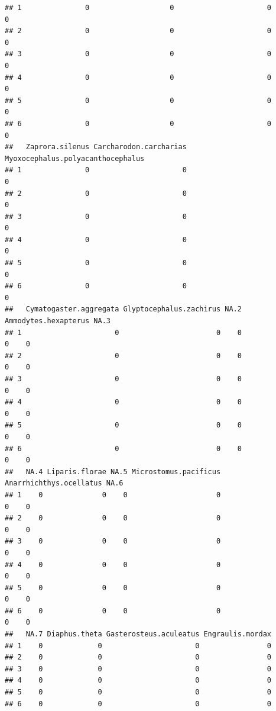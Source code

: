 \documentclass[
]{article}
\begin{document}
\begin{verbatim}
## 1               0                   0                      0                  0
## 2               0                   0                      0                  0
## 3               0                   0                      0                  0
## 4               0                   0                      0                  0
## 5               0                   0                      0                  0
## 6               0                   0                      0                  0
##   Zaprora.silenus Carcharodon.carcharias Myoxocephalus.polyacanthocephalus
## 1               0                      0                                 0
## 2               0                      0                                 0
## 3               0                      0                                 0
## 4               0                      0                                 0
## 5               0                      0                                 0
## 6               0                      0                                 0
##   Cymatogaster.aggregata Glyptocephalus.zachirus NA.2 Ammodytes.hexapterus NA.3
## 1                      0                       0    0                    0    0
## 2                      0                       0    0                    0    0
## 3                      0                       0    0                    0    0
## 4                      0                       0    0                    0    0
## 5                      0                       0    0                    0    0
## 6                      0                       0    0                    0    0
##   NA.4 Liparis.florae NA.5 Microstomus.pacificus Anarrhichthys.ocellatus NA.6
## 1    0              0    0                     0                       0    0
## 2    0              0    0                     0                       0    0
## 3    0              0    0                     0                       0    0
## 4    0              0    0                     0                       0    0
## 5    0              0    0                     0                       0    0
## 6    0              0    0                     0                       0    0
##   NA.7 Diaphus.theta Gasterosteus.aculeatus Engraulis.mordax
## 1    0             0                      0                0
## 2    0             0                      0                0
## 3    0             0                      0                0
## 4    0             0                      0                0
## 5    0             0                      0                0
## 6    0             0                      0                0

\end{verbatim}
\end{document}
